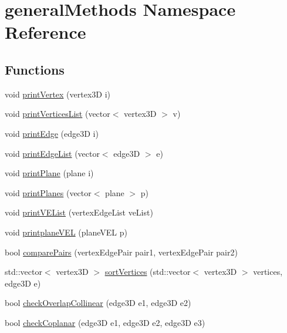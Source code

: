 \hypertarget{namespacegeneral_methods}{}\section{general\+Methods Namespace Reference}
\label{namespacegeneral_methods}
\subsection*{Functions}
\begin{DoxyCompactItemize}
\item 
void \mbox{\hyperlink{namespacegeneral_methods_a694306c7472ee1bbfb3c90c0f3d5453a}{print\+Vertex}} (vertex3D i)
\item 
void \mbox{\hyperlink{namespacegeneral_methods_a9cbf7d7c2019f0e2b6f9773b687b50cd}{print\+Vertices\+List}} (vector$<$ vertex3D $>$ v)
\item 
void \mbox{\hyperlink{namespacegeneral_methods_af9a1c28dacf89e746b51916fe178ce1a}{print\+Edge}} (edge3D i)
\item 
void \mbox{\hyperlink{namespacegeneral_methods_ab6b6f8a5d92b39ead6c97ec0917b75a4}{print\+Edge\+List}} (vector$<$ edge3D $>$ e)
\item 
void \mbox{\hyperlink{namespacegeneral_methods_a2decb2a442ba211e255e3b212f6ee041}{print\+Plane}} (plane i)
\item 
void \mbox{\hyperlink{namespacegeneral_methods_aa7c9b8abc94ae6b08d2cf083a08eaf21}{print\+Planes}} (vector$<$ plane $>$ p)
\item 
void \mbox{\hyperlink{namespacegeneral_methods_a60a9e0ba058824389fc703dc2dbbb7e3}{print\+V\+E\+List}} (vertex\+Edge\+List ve\+List)
\item 
void \mbox{\hyperlink{namespacegeneral_methods_adc8e104a2f2ed35a22be9a68051ec38d}{printplane\+V\+EL}} (plane\+V\+EL p)
\item 
bool \mbox{\hyperlink{namespacegeneral_methods_afc8f20af710f8dc24af591015acc1403}{compare\+Pairs}} (vertex\+Edge\+Pair pair1, vertex\+Edge\+Pair pair2)
\item 
std\+::vector$<$ vertex3D $>$ \mbox{\hyperlink{namespacegeneral_methods_a568dde4192d450d86f6563697887fbf0}{sort\+Vertices}} (std\+::vector$<$ vertex3D $>$ vertices, edge3D e)
\item 
bool \mbox{\hyperlink{namespacegeneral_methods_aa7662b2bcff30f8983da23da5edfc766}{check\+Overlap\+Collinear}} (edge3D e1, edge3D e2)
\item 
bool \mbox{\hyperlink{namespacegeneral_methods_a508d15a0c76920dc4f98cf8da254f9c4}{check\+Coplanar}} (edge3D e1, edge3D e2, edge3D e3)

\end{DoxyCompactItemize}
